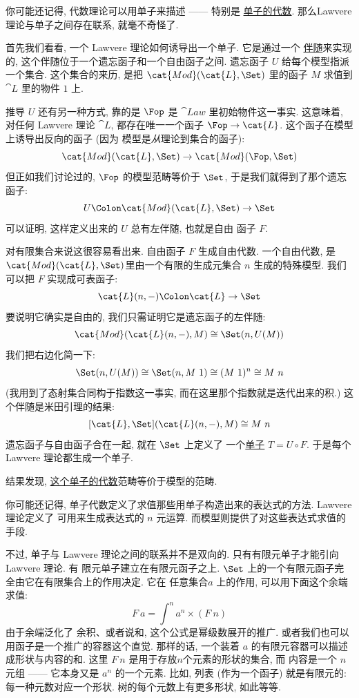 你可能还记得, 代数理论可以用单子来描述 —— 特别是 \hyperref[algebras-for-monads]{单子的代数}.
那么Lawvere 理论与单子之间存在联系, 就毫不奇怪了.

首先我们看看, 一个 Lawvere 理论如何诱导出一个单子. 它是通过一个
\hyperref[free-forgetful-adjunctions]{伴随}来实现的, 这个伴随位于一个遗忘函子和一个自由函子之间.
遗忘函子 $U$ 给每个模型指派一个集合. 这个集合的来历, 是把 $\cat{Mod}(\cat{L}, \Set)$ 里的函子 $M$
求值到 $\cat{L}$ 里的物件 $1$ 上.

推导 $U$ 还有另一种方式, 靠的是 $\Fop$ 是 $\cat{Law}$ 里初始物件这一事实. 这意味着, 对任何 Lawvere
理论 $\cat{L}$, 都存在唯一一个函子 $\Fop \to \cat{L}$. 这个函子在模型上诱导出反向的函子 (因为
模型是\emph{从}理论到集合的函子): \[\cat{Mod}(\cat{L}, \Set) \to \cat{Mod}(\Fop, \Set)\]
但正如我们讨论过的, $\Fop$ 的模型范畴等价于 $\Set$, 于是我们就得到了那个遗忘函子:
\[U \Colon \cat{Mod}(\cat{L}, \Set) \to \Set\] 可以证明, 这样定义出来的 $U$ 总有左伴随, 也就是自由
函子 $F$.

对有限集合来说这很容易看出来. 自由函子 $F$ 生成自由代数. 一个自由代数, 是
$\cat{Mod}(\cat{L}, \Set)$里由一个有限的生成元集合 $n$ 生成的特殊模型. 我们可以把 $F$ 实现成可表函子:
\[\cat{L}(n, -) \Colon \cat{L} \to \Set\] 要说明它确实是自由的, 我们只需证明它是遗忘函子的左伴随:
\[\cat{Mod}(\cat{L}(n, -), M) \cong \Set(n, U(M))\] 我们把右边化简一下:
\[\Set(n, U(M)) \cong \Set(n, M\ 1) \cong (M\ 1)^n \cong M\ n\] (我用到了态射集合同构于指数这一事实,
而在这里那个指数就是迭代出来的积.) 这个伴随是米田引理的结果:
\[[\cat{L}, \Set](\cat{L}(n, -), M) \cong M\ n\] 遗忘函子与自由函子合在一起, 就在 $\Set$ 上定义了
一个\hyperref[monads-categorically]{单子} $T = U \circ F$. 于是每个 Lawvere 理论都生成一个单子.

结果发现, \hyperref[algebras-for-monads]{这个单子的代数}范畴等价于模型的范畴.

你可能还记得, 单子代数定义了求值那些用单子构造出来的表达式的方法. Lawvere 理论定义了
可用来生成表达式的 $n$ 元运算. 而模型则提供了对这些表达式求值的手段.

不过, 单子与 Lawvere 理论之间的联系并不是双向的. 只有有限元单子才能引向 Lawvere 理论. 有
限元单子建立在有限元函子之上. $\Set$ 上的一个有限元函子完全由它在有限集合上的作用决定. 它在
任意集合$a$ 上的作用, 可以用下面这个余端求值: \[F\ a = \int^n a^n \times (F\ n)\] 由于余端泛化了
余积、或者说和, 这个公式是幂级数展开的推广. 或者我们也可以用函子是一个推广的容器这个直觉. 那样的话,
一个装着 $a$ 的有限元容器可以描述成形状与内容的和. 这里 $F\ n$ 是用于存放$n$个元素的形状的集合, 而
内容是一个 $n$ 元组 —— 它本身又是 $a^n$ 的一个元素. 比如, 列表 (作为一个函子) 就是有限元的:
每一种元数对应一个形状. 树的每个元数上有更多形状, 如此等等.


